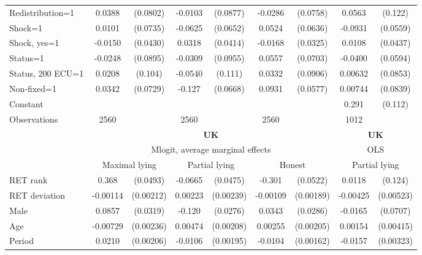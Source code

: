 \begin{tabular}{l|cccccc|cc}
Redistribution=1&   0.0388         & (0.0802)&  -0.0103         & (0.0877)&  -0.0286         & (0.0758)&   0.0563         &  (0.122)\\
Shock=1         &   0.0101         & (0.0735)&  -0.0625         & (0.0652)&   0.0524         & (0.0636)&  -0.0931\sym{*}  & (0.0559)\\
Shock, yes=1    &  -0.0150         & (0.0430)&   0.0318         & (0.0414)&  -0.0168         & (0.0325)&   0.0108         & (0.0437)\\
Status=1        &  -0.0248         & (0.0895)&  -0.0309         & (0.0955)&   0.0557         & (0.0703)&  -0.0400         & (0.0594)\\
Status, 200 ECU=1&   0.0208         &  (0.104)&  -0.0540         &  (0.111)&   0.0332         & (0.0906)&  0.00632         & (0.0853)\\
Non-fixed=1     &   0.0342         & (0.0729)&   -0.127\sym{*}  & (0.0668)&   0.0931         & (0.0577)&  0.00744         & (0.0839)\\
Constant        &                  &         &                  &         &                  &         &    0.291\sym{**} &  (0.112)\\
\hline
Observations    &     2560         &         &     2560         &         &     2560         &         &     1012         &         \\
\hline\hline
&\multicolumn{6}{c|}{\bf UK}&\multicolumn{2}{c}{\bf UK}\\ &\multicolumn{6}{c|}{Mlogit, average marginal effects }&\multicolumn{2}{c}{OLS}\\
                &\multicolumn{2}{c}{Maximal lying}&\multicolumn{2}{c}{Partial lying}&\multicolumn{2}{c}{Honest}  &\multicolumn{2}{c}{Partial lying}\\
\hline
RET rank        &    0.368\sym{***}& (0.0493)&  -0.0665         & (0.0475)&   -0.301\sym{***}& (0.0522)&   0.0118         &  (0.124)\\
RET deviation   & -0.00114         &(0.00212)&  0.00223         &(0.00239)& -0.00109         &(0.00189)& -0.00425         &(0.00523)\\
Male            &   0.0857\sym{***}& (0.0319)&   -0.120\sym{***}& (0.0276)&   0.0343         & (0.0286)&  -0.0165         & (0.0707)\\
Age             & -0.00729\sym{***}&(0.00236)&  0.00474\sym{**} &(0.00208)&  0.00255         &(0.00205)&  0.00154         &(0.00415)\\
Period          &   0.0210\sym{***}&(0.00206)&  -0.0106\sym{***}&(0.00195)&  -0.0104\sym{***}&(0.00162)&  -0.0157\sym{***}&(0.00323)\\

\end{tabular}
